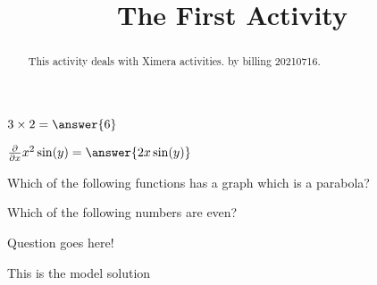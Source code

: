 \documentclass{ximera}
\title{The First Activity}
\begin{document}
  
\begin{abstract}  
This activity deals with Ximera activities.  
by billing 20210716.
\end{abstract}  
\maketitle  

\begin{question}
$3\times 2 = \answer{6}$
\end{question}


\begin{question}  
	$ \frac{\partial}{\partial x} x^2\sin(y) =  \answer{2x\sin(y)}$  
\end{question}


\begin{question}
Which of the following functions has a graph which is a parabola?
\begin{multipleChoice}
\end{multipleChoice}
\end{question}



\begin{question}
  Which of the following numbers are even?
  \begin{selectAll}
  \end{selectAll}
\end{question}



\begin{question}
Question goes here!
\begin{freeResponse}
This is the model solution %
\end{freeResponse}
\end{question}
\end{document}
